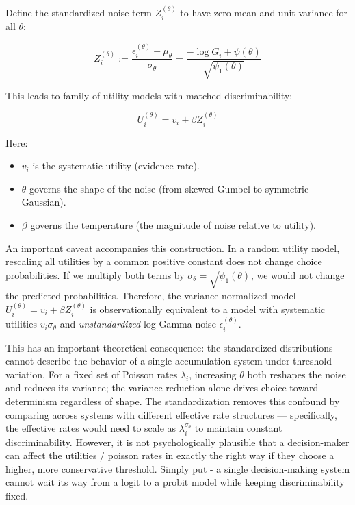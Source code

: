 \documentclass[
  man,
  floatsintext,
  longtable,
  a4paper,
  nolmodern,
  notxfonts,
  notimes,
  colorlinks=true,linkcolor=blue,citecolor=blue,urlcolor=blue]{apa7}
\providecommand{\tightlist}{%
  \setlength{\itemsep}{0pt}\setlength{\parskip}{0pt}}
\begin{document}
Define the standardized noise term \(Z_i^{(\theta)}\) to have zero mean
and unit variance for all \(\theta\):

\[
Z_i^{(\theta)} := \frac{\epsilon_i^{(\theta)} - \mu_\theta}{\sigma_\theta} = \frac{-\log G_i + \psi(\theta)}{\sqrt{\psi_1(\theta)}}
\]

This leads to family of utility models with matched discriminability:

\[
U_i^{(\theta)} = v_i + \beta Z_i^{(\theta)}
\]

Here:

\begin{itemize}
\tightlist
\item
  \(v_i\) is the systematic utility (evidence rate).
\item
  \(\theta\) governs the shape of the noise (from skewed Gumbel to
  symmetric Gaussian).
\item
  \(\beta\) governs the temperature (the magnitude of noise relative to
  utility).
\end{itemize}

An important caveat accompanies this construction. In a random utility
model, rescaling all utilities by a common positive constant does not
change choice probabilities. If we multiply both terms by
\(\sigma_\theta = \sqrt{\psi_1(\theta)}\), we would not change the
predicted probabilities. Therefore, the variance-normalized model
\(U_i^{(\theta)} = v_i + \beta Z_i^{(\theta)}\) is observationally
equivalent to a model with systematic utilities \(v_i \sigma_\theta\)
and \emph{unstandardized} log-Gamma noise \(\epsilon_i^{(\theta)}\).

This has an important theoretical consequence: the standardized
distributions cannot describe the behavior of a single accumulation
system under threshold variation. For a fixed set of Poisson rates
\(\lambda_i\), increasing \(\theta\) both reshapes the noise and reduces
its variance; the variance reduction alone drives choice toward
determinism regardless of shape. The standardization removes this
confound by comparing across systems with different effective rate
structures --- specifically, the effective rates would need to scale as
\(\lambda_i^{\sigma_\theta}\) to maintain constant discriminability.
However, it is not psychologically plausible that a decision-maker can
affect the utilities / poisson rates in exactly the right way if they
choose a higher, more conservative threshold. Simply put - a single
decision-making system cannot wait its way from a logit to a probit
model while keeping discriminability fixed.
\end{document}
